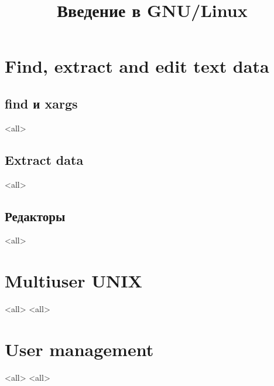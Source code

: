

\title{Введение в GNU/Linux}








\begin{frame}
	\frametitle{}
	\titlepage
	\vspace{-0.5cm}
	\begin{center}
	\end{center}
\end{frame}




\section{Find, extract and edit text data}
\subsection{find и xargs}
\mode<all>{}
\subsection{Extract data}
\mode<all>{}
\subsection{Редакторы}
\mode<all>{}

\section{Multiuser UNIX}
\mode<all>{}
\mode<all>{}

\section{User management}
\mode<all>{}
\mode<all>{}

